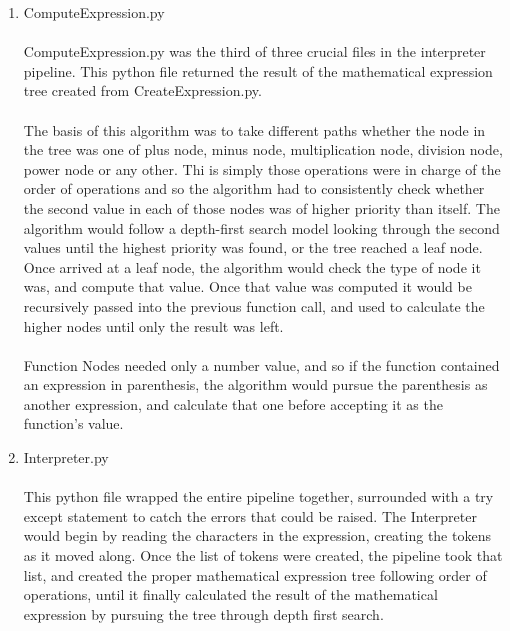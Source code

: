 \begin{enumerate}
            \item ComputeExpression.py
            \paragraph{}
            ComputeExpression.py was the third of three crucial files in the interpreter pipeline. This python file returned the result of the mathematical expression tree created from CreateExpression.py.

            \paragraph{}
            The basis of this algorithm was to take different paths whether the node in the tree was one of  plus node, minus node, multiplication node, division node, power node or any other. Thi is simply those operations were in charge of the order of operations and so the algorithm had to consistently check whether the second value in each of those nodes was of higher priority than itself. The algorithm would follow a depth-first search model looking through the second values until the highest priority was found, or the tree reached a leaf node. Once arrived at a leaf node, the algorithm would check the type of node it was, and compute that value. Once that value was computed it would be recursively passed into the previous function call, and used to calculate the higher nodes until only the result was left.

            \paragraph{}
            Function Nodes needed only a number value, and so if the function contained an expression in parenthesis, the algorithm would pursue the parenthesis as another expression, and calculate that one before accepting it as the function’s value.

            \item Interpreter.py
            \paragraph{}
            This python file wrapped the entire pipeline together, surrounded with a try except statement to catch the errors that could be raised. The Interpreter would begin by reading the characters in the expression, creating the tokens as it moved along. Once the list of tokens were created, the pipeline took that list, and created the proper mathematical expression tree following order of operations, until it finally calculated the result of the mathematical expression by pursuing the tree through depth first search.
        \end{enumerate}

